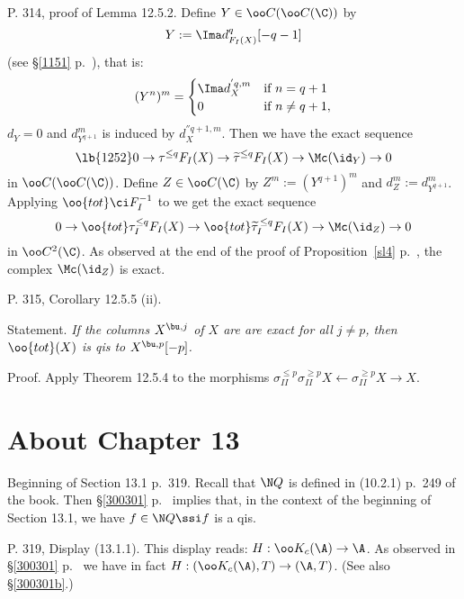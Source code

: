 \documentclass[12pt]{article}
\theoremstyle{remark}
\theoremstyle{definition}
\begin{document}
%

\begin{s}
P. 314, proof of Lemma 12.5.2. Define $Y\in\oo C(\oo C(\C))$ by 
$$
Y:=\Ima d^q_{F_I(X)}[-q-1]
$$ 
(see \S\ref{1151} p.~), that is: 
$$
(Y^n)^m=\begin{cases}\Ima d_X^{'q,m}&\text{if }n=q+1\\ 0&\text{if }n\neq q+1,\end{cases}
$$ 
$d_Y=0$ and $d^m_{Y^{q+1}}$ is induced by $d_X^{''q+1,m}$. Then we have the exact sequence 
\begin{equation}\lb{1252}
0\to\tau^{\le q}F_I(X)\to\widetilde\tau^{\le q}F_I(X)\to\Mc(\id_Y)\to0
\end{equation} 
in $\oo C(\oo C(\C))$. Define $Z\in\oo C(\C)$ by $Z^m:=(Y^{q+1})^m$ and $d^m_Z:=d^m_{Y^{q+1}}$. Applying $\oo{tot}\ci F_I^{-1}$ to  we get the exact sequence 
$$
0\to\oo{tot}\tau_I^{\le q}F_I(X)\to\oo{tot}\widetilde\tau_I^{\,\le q}F_I(X)\to\Mc(\id_Z)\to0
$$ 
in $\oo C^2(\C)$. As observed at the end of the proof of Proposition~\ref{sl4} p.~, the complex $\Mc(\id_Z)$ is exact.
\end{s}

%

\begin{s}
P. 315, Corollary 12.5.5 (ii).

\nn Statement. \emph{If the columns $X^{\bu,j}$ of $X$ are are exact for all $j\neq p$, then $\oo{tot}(X)$ is qis to $X^{\bu,p}[-p]$.}

\nn Proof. Apply Theorem 12.5.4 to the morphisms $\sigma_{II}^{\le p}\sigma_{II}^{\ge p}X\leftarrow\sigma_{II}^{\ge p}X\to X$.
\end{s}


\section{About Chapter 13}


\begin{s}
Beginning of Section 13.1 p.~319. Recall that $\N Q$ is defined in (10.2.1) p.~249 of the book. Then \S\ref{300301} p.~ implies that, in the context of the beginning of Section 13.1, we have $f\in\N Q\ssi f$ is a qis. 
\end{s}

%

\begin{s}
P. 319, Display (13.1.1). This display reads: $H:\oo K_c(\A)\to\A$. As observed in \S\ref{300301} p.~ we have in fact $H:(\oo K_c(\A),T)\to(\A,T)$. (See also \S\ref{300301b}.)
\end{s}
\end{document}
